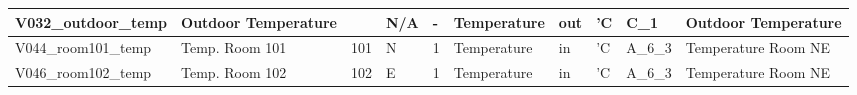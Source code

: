 \begin{landscape}
\begin{table}[htbp]
\begin{tabular}{|l|l|r|l|r|l|l|l|l|l|}
    \hline
    V032\_outdoor\_temp & Outdoor Temperature &      & N/A  & \multicolumn{1}{l|}{-} & Temperature & out  & 'C   & C\_1 & Outdoor Temperature \bigstrut\\
    \hline
    \rowcolor[rgb]{ .851,  .851,  .851} V044\_room101\_temp & Temp. Room 101  & 101  & N    & 1    & Temperature & in   & 'C   & A\_6\_3 & Temperature Room NE \bigstrut\\
    \hline
    V046\_room102\_temp & Temp. Room 102 & 102  & E    & 1    & Temperature & in   & 'C   & A\_6\_3 & Temperature Room NE \bigstrut\\
    \hline
    \end{tabular}%
  \label{tab:metadata_2}%
\end{table}%
\end{landscape}
\pagebreak
\restoregeometry




